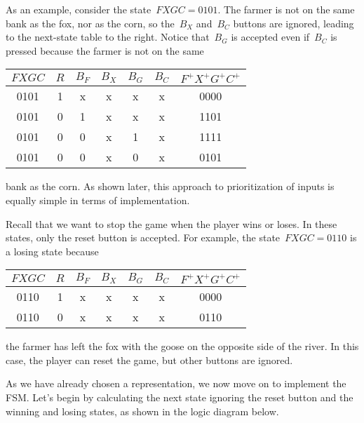\begin{minipage}{2.9in}
As an example, consider the 
state~$FXGC=0101$.  The farmer is not on the same bank as the fox, nor
as the corn, so the~$B_X$ and~$B_C$ buttons are ignored, leading to the
next-state table to the right.  Notice that~$B_G$ is accepted even if~$B_C$
is pressed because the farmer is not on the same\linebreak
\end{minipage}\hspace{0.25in}%
\begin{minipage}{3.35in}
\begin{tabular}{cccccc|c}
$FXGC$& $R$& $B_F$& $B_X$& $B_G$& $B_C$& $F^+X^+G^+C^+$\\ \hline
0101& 1& x& x& x& x& 0000\\
0101& 0& 1& x& x& x& 1101\\
0101& 0& 0& x& 1& x& 1111\\
0101& 0& 0& x& 0& x& 0101\\
\end{tabular}\vspace{12pt}
\end{minipage}\mpdone

bank as the corn.
As shown later, this approach to prioritization
of inputs is equally simple in terms of implementation.  

\begin{minipage}{2.9in}
Recall that we want to stop the game when the player wins or loses.
In these states, only the reset button is accepted.  For example, the 
state~$FXGC=0110$ is a losing state because\linebreak
\end{minipage}\hspace{0.25in}%
\begin{minipage}{3.35in}
\begin{tabular}{cccccc|c}
$FXGC$& $R$& $B_F$& $B_X$& $B_G$& $B_C$& $F^+X^+G^+C^+$\\ \hline
0110& 1& x& x& x& x& 0000\\
0110& 0& x& x& x& x& 0110\\
\end{tabular}\vspace{12pt}
\end{minipage}\mpdone

the farmer
has left the fox with the goose on the opposite side of the river.
In this case, the player can reset the game, but other buttons
are ignored.

As we have already chosen a representation, we now move on to implement
the FSM.  Let's begin by calculating the next state ignoring the
reset button and the winning and losing states, as shown in the logic 
diagram below.\\

